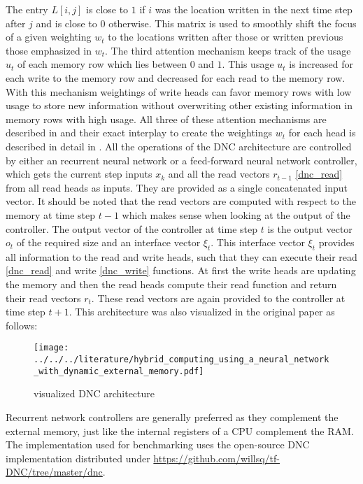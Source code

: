 \documentclass[draft,final]{vutinfth} %
\begin{document}
    The entry $L[i,j]$ is close to $1$ if $i$ was the location written in the next time step after $j$ and is close to $0$ otherwise.
    This matrix is used to smoothly shift the focus of a given weighting $w_t$ to the locations written after those or written previous those emphasized in $w_t$.
    The third attention mechanism keeps track of the usage $u_t$ of each memory row which lies between $0$ and $1$. 
    This usage $u_t$ is increased for each write to the memory row and decreased for each read to the memory row.
    With this mechanism weightings of write heads can favor memory rows with low usage to store new information without overwriting other existing information in memory rows with high usage.
    All three of these attention mechanisms are described in \cite[p. 1-2]{DNC} and their exact interplay to create the weightings $w_t$ for each head is described in detail in \cite[p. 7-8]{DNC}.
    All the operations of the DNC architecture are controlled by either an recurrent neural network or a feed-forward neural network controller, which gets the current step inputs $x_k$ and all the read vectors $r_{t-1}$ \ref{dnc_read} from all read heads as inputs.
    They are provided as a single concatenated input vector.
    It should be noted that the read vectors are computed with respect to the memory at time step $t-1$ which makes sense when looking at the output of the controller.
    The output vector of the controller at time step $t$ is the output vector $o_t$ of the required size and an interface vector $\xi_t$.
    This interface vector $\xi_t$ provides all information to the read and write heads, such that they can execute their read \ref{dnc_read} and write \ref{dnc_write} functions.
    At first the write heads are updating the memory and then the read heads compute their read function and return their read vectors $r_t$.
    These read vectors are again provided to the controller at time step $t+1$.
    This architecture was also visualized in the original paper as follows:
    \begin{figure}[H]
        \centering{}
        \texttt{[image: ../../../literature/hybrid\_computing\_using\_a\_neural\_network\_with\_dynamic\_external\_memory.pdf]}
        \caption{visualized DNC architecture \cite[p. 2]{DNC}}
        \label{fig:dnc_vis}
    \end{figure}
    Recurrent network controllers are generally preferred as they complement the external memory, just like the internal registers of a CPU complement the RAM.
    The implementation used for benchmarking uses the open-source DNC implementation distributed under \url{https://github.com/willsq/tf-DNC/tree/master/dnc}.
\end{document}

